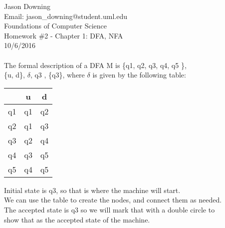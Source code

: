 \documentclass[12pt]{article}
\begin{document}
\noindent
Jason Downing \\
Email: jason\_downing@student.uml.edu \\
Foundations of Computer Science \\
Homework \#2 - Chapter 1: DFA, NFA\\
10/6/2016 \\

 \\
The formal description of a DFA M is \{q1, q2, q3, q4, q5 \}, \\
\{u, d\}, $\delta$, q3 , \{q3\}, where $\delta$  is given by the following table:
\begin{center}
\begin{tabular}{ c | c c }
 & u & d \\
\hline
 q1 & q1 & q2 \\ 
 q2 & q1 & q3 \\  
 q3 & q2 & q4 \\
 q4 & q3 & q5 \\
 q5 & q4 & q5
\end{tabular}
\end{center}

\noindent
Initial state is q3, so that is where the machine will start. \\
We can use the table to create the nodes, and connect them as needed. \\
The accepted state is q3 so we will mark that with a double circle to \\
show that as the accepted state of the machine. \\

\begin{center}
 \\
\end{center}
\end{document}
